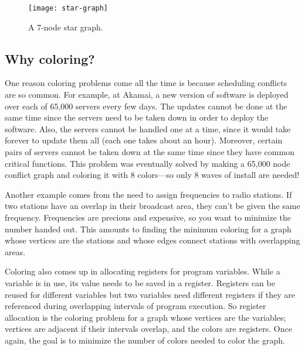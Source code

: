 \begin{figure}

\texttt{[image: star-graph]}

\caption{A 7-node star graph.}

\label{fig:5T}

\end{figure}


\subsection{Why coloring?}

One reason coloring problems come all the time is because scheduling
conflicts are so common.  For example, at Akamai, a new version of
software is deployed over each of 65,000 servers every few days.  The
updates cannot be done at the same time since the servers need to be taken
down in order to deploy the software.  Also, the servers cannot be handled
one at a time, since it would take forever to update them all (each one
takes about an hour).  Moreover, certain pairs of servers cannot be taken
down at the same time since they have common critical functions.  This
problem was eventually solved by making a 65,000 node conflict graph and
coloring it with 8 colors---so only 8 waves of install are needed!

Another example comes from the need to assign frequencies to radio
stations.  If two stations have an overlap in their broadcast area, they
can't be given the same frequency.  Frequencies are precious and
expensive, so you want to minimize the number handed out.  This amounts to
finding the minimum coloring for a graph whose vertices are the stations
and whose edges connect stations with overlapping areas.

Coloring also comes up in allocating registers for program variables.
While a variable is in use, its value needs to be saved in a register.
Registers can be reused for different variables but two variables need
different registers if they are referenced during overlapping
intervals of program execution.  So register allocation is the
coloring problem for a graph whose vertices are the variables;
vertices are adjacent if their intervals overlap, and the colors are
registers.  Once again, the goal is to minimize the number of colors
needed to color the graph.

